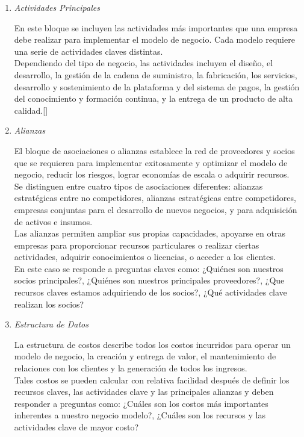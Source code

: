 \documentclass[10pt,a4paper]{article}
\begin{document}
\begin{multicols}{2}
\begin{enumerate}[1.]
			\item \textit{Actividades Principales}
			
			En este bloque se incluyen las actividades más importantes que una empresa debe realizar para implementar el modelo de negocio. Cada modelo requiere una serie de actividades claves distintas.\\
			
			Dependiendo del tipo de negocio, las actividades incluyen el diseño, el desarrollo, la gestión de la cadena de suministro, la fabricación, los servicios, desarrollo y sostenimiento de la plataforma y del sistema de pagos, la gestión del conocimiento y formación continua, y la entrega de un producto de alta calidad.[]
			
			\item \textit{Alianzas}
			
			El bloque de asociaciones o alianzas establece la red de proveedores y socios que se requieren para implementar exitosamente y optimizar el modelo de negocio, reducir los riesgos, lograr economías de escala o adquirir recursos.\\
			
			Se distinguen entre cuatro tipos de asociaciones diferentes: alianzas estratégicas entre no competidores, alianzas estratégicas entre competidores, empresas conjuntas para el desarrollo de nuevos negocios, y para adquisición de activos e insumos.\\
			
			Las alianzas permiten ampliar sus propias capacidades, apoyarse en otras empresas para proporcionar recursos particulares o realizar ciertas actividades, adquirir conocimientos o licencias, o acceder a los clientes.\\
			
			En este caso se responde a preguntas claves como: ¿Quiénes son nuestros socios principales?, ¿Quiénes son nuestros principales proveedores?, ¿Que recursos claves estamos adquiriendo de los socios?, ¿Qué actividades clave realizan los socios?
			
			\item \textit{Estructura de Datos}
			
			La estructura de costos describe todos los costos incurridos para operar un modelo de negocio, la creación y entrega de valor, el mantenimiento de relaciones con los clientes y la generación de todos los ingresos.\\
			
			Tales costos se pueden calcular con relativa facilidad después de definir los recursos claves, las actividades clave y las principales alianzas y deben responder a preguntas como: ¿Cuáles son los costos más importantes inherentes a nuestro negocio modelo?, ¿Cuáles son los recursos y las actividades clave de mayor costo?\\


		\end{enumerate}
		
		
			
			
			
		\end{multicols}	
			
\end{document}
